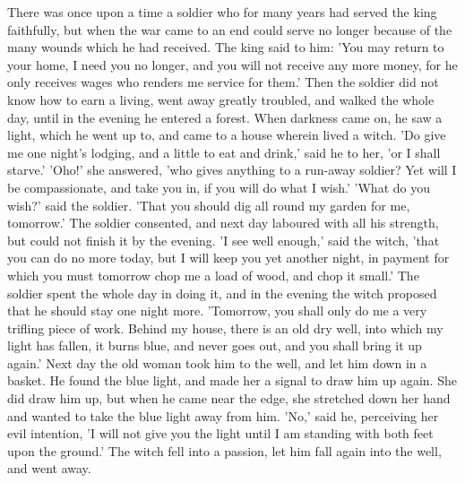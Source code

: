 \documentclass[12pt]{book}
\begin{document}
There was once upon a time a soldier who for many years had served the
king faithfully, but when the war came to an end could serve no longer
because of the many wounds which he had received. The king said to
him: 'You may return to your home, I need you no longer, and you will
not receive any more money, for he only receives wages who renders me
service for them.' Then the soldier did not know how to earn a living,
went away greatly troubled, and walked the whole day, until in the
evening he entered a forest. When darkness came on, he saw a light,
which he went up to, and came to a house wherein lived a witch. 'Do
give me one night's lodging, and a little to eat and drink,' said he
to her, 'or I shall starve.' 'Oho!' she answered, 'who gives anything
to a run-away soldier? Yet will I be compassionate, and take you in,
if you will do what I wish.' 'What do you wish?' said the soldier.
'That you should dig all round my garden for me, tomorrow.' The
soldier consented, and next day laboured with all his strength, but
could not finish it by the evening. 'I see well enough,' said the
witch, 'that you can do no more today, but I will keep you yet another
night, in payment for which you must tomorrow chop me a load of wood,
and chop it small.' The soldier spent the whole day in doing it, and
in the evening the witch proposed that he should stay one night more.
'Tomorrow, you shall only do me a very trifling piece of work. Behind
my house, there is an old dry well, into which my light has fallen, it
burns blue, and never goes out, and you shall bring it up again.' Next
day the old woman took him to the well, and let him down in a basket.
He found the blue light, and made her a signal to draw him up again.
She did draw him up, but when he came near the edge, she stretched
down her hand and wanted to take the blue light away from him. 'No,'
said he, perceiving her evil intention, 'I will not give you the light
until I am standing with both feet upon the ground.' The witch fell
into a passion, let him fall again into the well, and went away.
\end{document}
